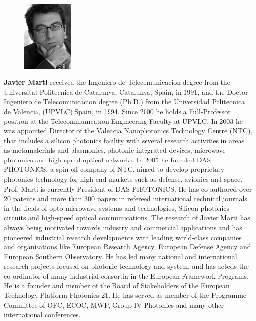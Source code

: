 \documentclass[journal]{IEEEtran}
\newcommand{\extraSpace}{\vspace{30pt}}
\begin{document}
\begin{figure}
\includegraphics[width=1in]{javier}
\end{figure}
\textbf{Javier Marti} received the Ingeniero de Telecomunicacion degree from the Universitat Politecnica de Catalunya, Catalunya, Spain, in 1991, and the Doctor Ingeniero de Telecomunicacion degree (Ph.D.) from the Universidad Politecnica de Valencia, (UPVLC) Spain, in 1994. Since 2000 he holds a Full-Professor position at the Telecommunication Engineering Faculty at UPVLC. In 2003 he was appointed Director of the Valencia Nanophotonics Technology Centre (NTC), that includes a silicon photonics facility with several research activities in areas as metamaterials and plasmonics, photonic integrated devices, microwave photonics and high-speed optical networks. In 2005 he founded DAS PHOTONICS, a spin-off company of NTC, aimed to develop proprietary photonics technology for high end markets such as  defense, avionics and space. Prof. Marti is currently President of DAS PHOTONICS.
He has co-authored over 20 patents and more than 300 papers in refereed international technical journals in the fields of opto-microwave systems and technologies, Silicon photonics circuits and high-speed optical communications.
The research of Javier Marti has always being motivated towards industry and commercial applications and has pioneered industrial research developments with leading world-class companies and organisations like European Research Agency, European Defense Agency and European Southern Observatory. He has led many national and international research projects focused on photonic technology and system, and has acteds the co-ordinator of many industrial consortia in the European Framework Programs. He is a founder and member of the Board of Stakeholders of the European Technology Platform Photonics 21. He has served as member of the Programme Committee of OFC, ECOC, MWP, Group IV Photonics and many other international conferences.
\extraSpace
\end{document}
